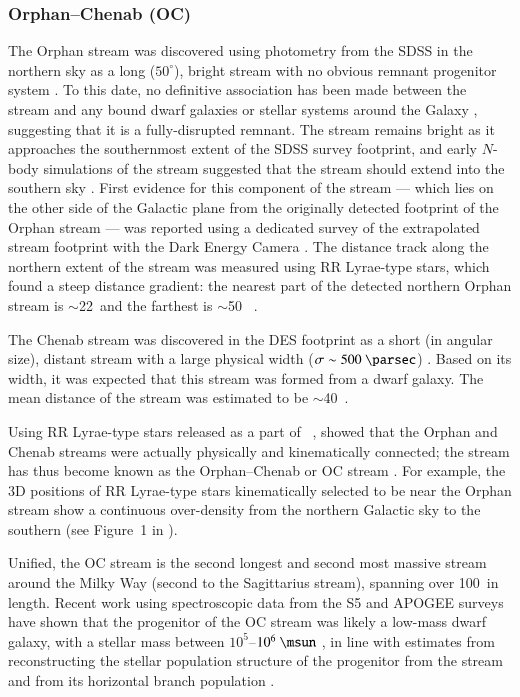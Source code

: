 \documentclass[final,5p,times,twocolumn,authoryear]{elsarticle}
\begin{document}
\subsubsection{Orphan--Chenab (OC)}
\label{sec:oc}

The Orphan stream was discovered using photometry from the SDSS in the northern sky as a
long ($50^\circ$), bright stream with no obvious remnant progenitor system
\citep{belokurov:2006, grillmair:2006-orphan, belokurov:2007}.
To this date, no definitive association has been made between the stream and any bound
dwarf galaxies or stellar systems around the Galaxy \citep{fellhauer:2007, newberg:2010,
casey:2013, casey:2014, grillmair:2015}, suggesting that it is a fully-disrupted
remnant.
The stream remains bright as it approaches the southernmost extent of the SDSS survey
footprint, and early $N$-body simulations of the stream suggested that the stream should
extend into the southern sky \citep[e.g.,][]{sales:2008}.
First evidence for this component of the stream --- which lies on the other side of the
Galactic plane from the originally detected footprint of the Orphan stream --- was
reported using a dedicated survey of the extrapolated stream footprint with the Dark
Energy Camera \citep{grillmair:2015}.
The distance track along the northern extent of the stream was measured using RR
Lyrae-type stars, which found a steep distance gradient: the nearest part of the
detected northern Orphan stream is $\sim$22~\kpc and the farthest is $\sim$50~\kpc
\citep{sesar:2013, hendel:2018}.

The Chenab stream was discovered in the DES footprint as a short (in angular size),
distant stream with a large physical width ($\sigma \sim 500~\unit{\parsec}$)
\citep{shipp:2018}. Based on its width, it was expected that this stream was formed from
a dwarf galaxy. The mean distance of the stream was estimated to be $\sim$40~\kpc.

Using RR Lyrae-type stars released as a part of \gaia\ , \citet{koposov:2019}
showed that the Orphan and Chenab streams were actually physically and kinematically
connected; the stream has thus become known as the Orphan--Chenab or OC stream
\citep[see also][]{fardal:2019}.
For example, the 3D positions of RR Lyrae-type stars kinematically selected to be near
the Orphan stream show a continuous over-density from the northern Galactic sky to the
southern (see Figure~1 in \citealt{koposov:2019}).

Unified, the OC stream is the second longest and second most massive stream around the
Milky Way (second to the Sagittarius stream), spanning over 100~\kpc in length.
Recent work using spectroscopic data from the S5 and APOGEE surveys have shown that the
progenitor of the OC stream was likely a low-mass dwarf galaxy, with a stellar mass
between $10^5$--$10^6~\unit{\msun}$ \citep{koposov:2023, hawkins:2023}, in line with
estimates from reconstructing the stellar population structure of the progenitor from
the stream \citep{mendelsohn:2022} and from its horizontal branch population \citep{prudil:2021}.
\end{document}
